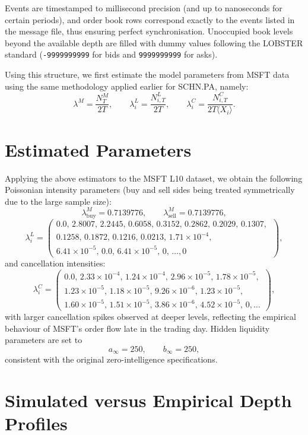 Events are timestamped to millisecond precision (and up to nanoseconds for certain
periods), and order book rows correspond exactly to the events listed in the message file,
thus ensuring perfect synchronisation. Unoccupied book levels beyond the available depth
are filled with dummy values following the LOBSTER standard
(\texttt{-9999999999} for bids and \texttt{9999999999} for asks).

Using this structure, we first estimate the model parameters from MSFT data using the
same methodology applied earlier for SCHN.PA, namely:
\[
\lambda^{M} = \frac{N^{M}_{T}}{2T}, \qquad
\lambda^{L}_{i} = \frac{N^{L}_{i,T}}{2T}, \qquad
\lambda^{C}_{i} = \frac{N^{C}_{i,T}}{2T \langle X_{i} \rangle}.
\]

\section{Estimated Parameters}

Applying the above estimators to the MSFT L10 dataset, we obtain the following Poissonian
intensity parameters (buy and sell sides being treated symmetrically due to the large sample
size):
\[
\lambda^{M}_{\text{buy}} = 0.7139776, \qquad
\lambda^{M}_{\text{sell}} = 0.7139776,
\]
\[
\lambda^{L}_{i} = 
\begin{pmatrix}
0.0,\, 2.8007,\, 2.2445,\, 0.6058,\, 0.3152,\, 0.2862,\, 0.2029,\,
0.1307,\, \\0.1258,\, 0.1872,\, 0.1216,\, 0.0213,\, 1.71\times10^{-4},\,\\
6.41\times10^{-5},\, 0.0,\, 6.41\times10^{-5},\, 0,\, \ldots, 0
\end{pmatrix},
\]
and cancellation intensities:
\[
\lambda^{C}_{i} =
\begin{pmatrix}
0.0,\, 2.33\times10^{-4},\, 1.24\times10^{-4},\, 2.96\times10^{-5},\,
1.78\times10^{-5},\, \\ 1.23\times10^{-5},\, 1.18\times10^{-5},\, 
9.26\times10^{-6},\, 1.23\times10^{-5},\, \\ 1.60\times10^{-5},\, 
1.51\times10^{-5},\, 3.86\times10^{-6},\, 4.52\times10^{-5},\, 0,\dots
\end{pmatrix},
\]
with larger cancellation spikes observed at deeper levels, reflecting the empirical behaviour
of MSFT's order flow late in the trading day. Hidden liquidity parameters are set to
\[
a_{\infty} = 250, \qquad b_{\infty} = 250,
\]
consistent with the original zero-intelligence specifications.

\section{Simulated versus Empirical Depth Profiles}

